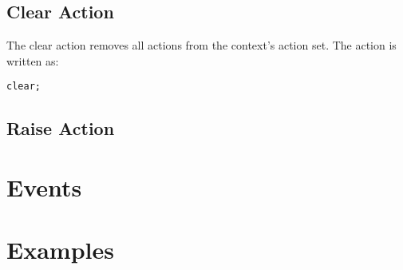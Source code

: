 \subsection{Clear Action} \label{clear_action_tut}

The clear action removes all actions from the context's action set. The action is written as:

\begin{lstlisting}
clear;
\end{lstlisting}

\subsection{Raise Action} \label{raise_action_tut}

\section{Events} \label{event_tut}

\section{Examples} \label{examples_tut}